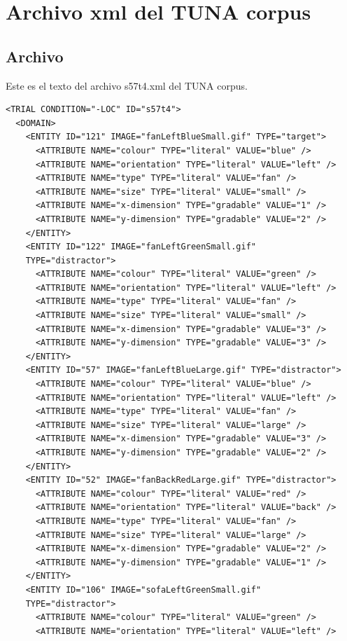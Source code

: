 \chapter{Archivo xml del TUNA corpus}
\section{Archivo}
\label{archivos-xml-tuna}

Este es el texto del archivo s57t4.xml del TUNA corpus.
\begin{verbatim}
<TRIAL CONDITION="-LOC" ID="s57t4">
  <DOMAIN>
    <ENTITY ID="121" IMAGE="fanLeftBlueSmall.gif" TYPE="target">
      <ATTRIBUTE NAME="colour" TYPE="literal" VALUE="blue" />
      <ATTRIBUTE NAME="orientation" TYPE="literal" VALUE="left" />
      <ATTRIBUTE NAME="type" TYPE="literal" VALUE="fan" />
      <ATTRIBUTE NAME="size" TYPE="literal" VALUE="small" />
      <ATTRIBUTE NAME="x-dimension" TYPE="gradable" VALUE="1" />
      <ATTRIBUTE NAME="y-dimension" TYPE="gradable" VALUE="2" />
    </ENTITY>
    <ENTITY ID="122" IMAGE="fanLeftGreenSmall.gif"
    TYPE="distractor">
      <ATTRIBUTE NAME="colour" TYPE="literal" VALUE="green" />
      <ATTRIBUTE NAME="orientation" TYPE="literal" VALUE="left" />
      <ATTRIBUTE NAME="type" TYPE="literal" VALUE="fan" />
      <ATTRIBUTE NAME="size" TYPE="literal" VALUE="small" />
      <ATTRIBUTE NAME="x-dimension" TYPE="gradable" VALUE="3" />
      <ATTRIBUTE NAME="y-dimension" TYPE="gradable" VALUE="3" />
    </ENTITY>
    <ENTITY ID="57" IMAGE="fanLeftBlueLarge.gif" TYPE="distractor">
      <ATTRIBUTE NAME="colour" TYPE="literal" VALUE="blue" />
      <ATTRIBUTE NAME="orientation" TYPE="literal" VALUE="left" />
      <ATTRIBUTE NAME="type" TYPE="literal" VALUE="fan" />
      <ATTRIBUTE NAME="size" TYPE="literal" VALUE="large" />
      <ATTRIBUTE NAME="x-dimension" TYPE="gradable" VALUE="3" />
      <ATTRIBUTE NAME="y-dimension" TYPE="gradable" VALUE="2" />
    </ENTITY>
    <ENTITY ID="52" IMAGE="fanBackRedLarge.gif" TYPE="distractor">
      <ATTRIBUTE NAME="colour" TYPE="literal" VALUE="red" />
      <ATTRIBUTE NAME="orientation" TYPE="literal" VALUE="back" />
      <ATTRIBUTE NAME="type" TYPE="literal" VALUE="fan" />
      <ATTRIBUTE NAME="size" TYPE="literal" VALUE="large" />
      <ATTRIBUTE NAME="x-dimension" TYPE="gradable" VALUE="2" />
      <ATTRIBUTE NAME="y-dimension" TYPE="gradable" VALUE="1" />
    </ENTITY>
    <ENTITY ID="106" IMAGE="sofaLeftGreenSmall.gif"
    TYPE="distractor">
      <ATTRIBUTE NAME="colour" TYPE="literal" VALUE="green" />
      <ATTRIBUTE NAME="orientation" TYPE="literal" VALUE="left" />

\end{verbatim}
